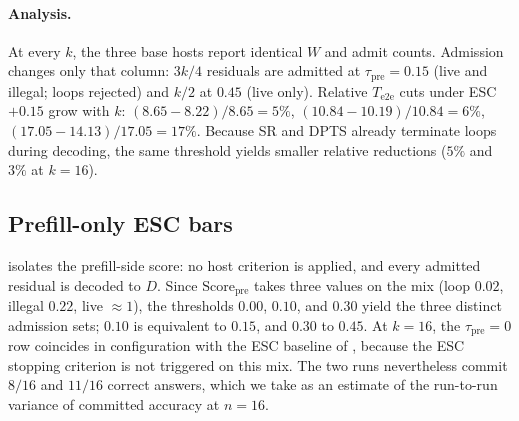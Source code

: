 \paragraph{Analysis.}
At every $k$, the three base hosts report identical $W$ and admit counts.
Admission changes only that column: $3k/4$ residuals are admitted at $\tau_{\mathrm{pre}}{=}0.15$
(live and illegal; loops rejected) and $k/2$ at $0.45$ (live only).
Relative $T_{\mathrm{e2e}}$ cuts under ESC${+}0.15$ grow with $k$:
$(8.65{-}8.22)/8.65{=}5\%$,
$(10.84{-}10.19)/10.84{=}6\%$,
$(17.05{-}14.13)/17.05{=}17\%$.
Because SR and DPTS already terminate loops during decoding, the same threshold yields smaller relative reductions
($5\%$ and $3\%$ at $k{=}16$).

\subsection{Prefill-only ESC bars}
\label{sec:ablate-prefill}

 isolates the prefill-side score: no host criterion is applied, and every admitted residual is decoded to $D$.
Since $\mathrm{Score}_{\mathrm{pre}}$ takes three values on the mix (loop $0.02$, illegal $0.22$, live $\approx1$), the thresholds $0.00$, $0.10$, and $0.30$ yield the three distinct admission sets; $0.10$ is equivalent to $0.15$, and $0.30$ to $0.45$.
At $k{=}16$, the $\tau_{\mathrm{pre}}{=}0$ row coincides in configuration with the ESC baseline of , because the ESC stopping criterion is not triggered on this mix.
The two runs nevertheless commit $8/16$ and $11/16$ correct answers, which we take as an estimate of the run-to-run variance of committed accuracy at $n{=}16$.

